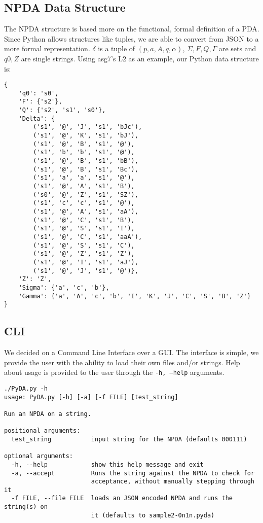 \documentclass[a4paper]{report}
\begin{document}
\subsection*{NPDA Data Structure}
The NPDA structure is based more on the functional, formal definition of a PDA.
Since Python allows structures like tuples, we are able to convert from JSON to
a more formal representation. $\delta$ is a tuple of $(p,a,A,q,\alpha)$,
$\Sigma, F, Q, \Gamma$ are sets and $q0, Z$ are single strings. Using asg7's L2
as an example, our Python data structure is:
\begin{verbatim}
{
    'q0': 's0',
    'F': {'s2'},
    'Q': {'s2', 's1', 's0'},
    'Delta': {
        ('s1', '@', 'J', 's1', 'bJc'),
        ('s1', '@', 'K', 's1', 'bJ'),
        ('s1', '@', 'B', 's1', '@'),
        ('s1', 'b', 'b', 's1', '@'),
        ('s1', '@', 'B', 's1', 'bB'),
        ('s1', '@', 'B', 's1', 'Bc'),
        ('s1', 'a', 'a', 's1', '@'),
        ('s1', '@', 'A', 's1', 'B'),
        ('s0', '@', 'Z', 's1', 'SZ'),
        ('s1', 'c', 'c', 's1', '@'),
        ('s1', '@', 'A', 's1', 'aA'),
        ('s1', '@', 'C', 's1', 'B'),
        ('s1', '@', 'S', 's1', 'I'),
        ('s1', '@', 'C', 's1', 'aaA'),
        ('s1', '@', 'S', 's1', 'C'),
        ('s1', '@', 'Z', 's1', 'Z'),
        ('s1', '@', 'I', 's1', 'aJ'),
        ('s1', '@', 'J', 's1', '@')},
    'Z': 'Z',
    'Sigma': {'a', 'c', 'b'},
    'Gamma': {'a', 'A', 'c', 'b', 'I', 'K', 'J', 'C', 'S', 'B', 'Z'}
}
\end{verbatim}
\subsection*{CLI}
We decided on a Command Line Interface over a GUI. The interface is simple, we
provide the user with the ability to load their own files and/or strings. Help
about usage is provided to the user through the \texttt{-h, --help} arguments.
\begin{verbatim}
./PyDA.py -h
usage: PyDA.py [-h] [-a] [-f FILE] [test_string]

Run an NPDA on a string.

positional arguments:
  test_string           input string for the NPDA (defaults 000111)

optional arguments:
  -h, --help            show this help message and exit
  -a, --accept          Runs the string against the NPDA to check for
                        acceptance, without manually stepping through it
  -f FILE, --file FILE  loads an JSON encoded NPDA and runs the string(s) on
                        it (defaults to sample2-0n1n.pyda)
\end{verbatim}
\end{document}
